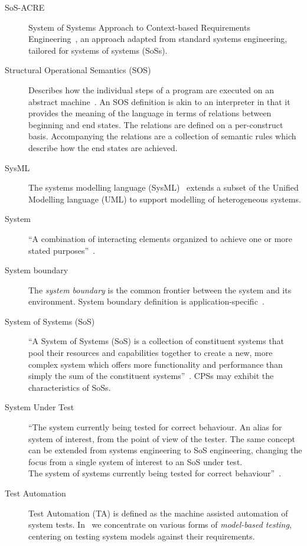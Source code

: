\begin{description}
\item[SoS-ACRE] System of Systems Approach to Context-based Requirements Engineering~\cite{Holt&15}, an approach adapted from standard systems engineering, tailored for systems of systems (SoSs).

\item[Structural Operational Semantics (SOS)] Describes how the individual steps of a program are executed on an abstract machine~\cite{Plotkin81}. An SOS definition is akin to an interpreter in that it provides the meaning of the language in terms of relations between beginning and end states. The relations are defined on a per-construct basis. Accompanying the relations are a collection of semantic rules which describe how the end states are achieved.

\item[SysML] The systems modelling language (SysML)~\cite{SysML12} extends a subset of the Unified Modelling language (UML) to support modelling of heterogeneous systems.

\item[System] ``A combination of interacting elements organized to achieve one or more stated purposes''~\cite{INCOSEseh15}.

\item[System boundary] The \emph{system boundary} is the common frontier between the system and its environment. System boundary definition is application-specific~\cite{Broenink&12b}.

\item[System of Systems (SoS)] ``A System of Systems (SoS) is a collection of constituent systems that pool their resources and capabilities together to create a new, more complex system which offers more functionality and performance than simply the sum of the constituent systems''~\cite{Holt&14}. CPSs may exhibit the characteristics of SoSs.

\item[System Under Test] ``The system currently being tested for correct behaviour. An alias for system of interest, from the point of view of the tester. The same concept can be extended from systems engineering to SoS engineering, changing the focus from a single system of interest to an SoS under test.\\
The system of systems currently being tested for correct behaviour''~\cite{Holt&14}.

\item[Test Automation] Test Automation (TA) is defined as the machine assisted automation of system tests. In \into\ we concentrate on various forms of \emph{model-based testing}, centering on testing system models against their requirements.


\end{description}

